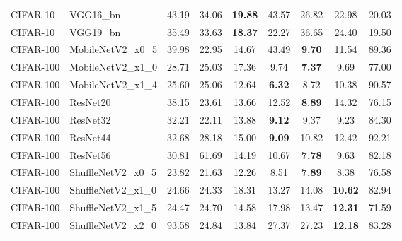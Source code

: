 \begin{table}[h!]
{\begin{tabular}{llccccccc}
 CIFAR-10 &          VGG16\_bn &         43.19 &        34.06 & \textbf{19.88} &                  43.57 &                  26.82 &                  22.98 &       20.03 \\
 CIFAR-10 &          VGG19\_bn &         35.49 &        33.63 & \textbf{18.37} &                  22.27 &                  36.65 &                  24.40 &       19.50 \\
CIFAR-100 &  MobileNetV2\_x0\_5 &         39.98 &        22.95 &                  14.67 &                  43.49 &  \textbf{9.70} &                  11.54 &       89.36 \\
CIFAR-100 &  MobileNetV2\_x1\_0 &         28.71 &        25.03 &                  17.36 &                   9.74 &  \textbf{7.37} &                   9.69 &       77.00 \\
CIFAR-100 &  MobileNetV2\_x1\_4 &         25.60 &        25.06 &                  12.64 &  \textbf{6.32} &                   8.72 &                  10.38 &       90.57 \\
CIFAR-100 &          ResNet20 &         38.15 &        23.61 &                  13.66 &                  12.52 &  \textbf{8.89} &                  14.32 &       76.15 \\
CIFAR-100 &          ResNet32 &         32.21 &        22.11 &                  13.88 &  \textbf{9.12} &                   9.37 &                   9.23 &       84.30 \\
CIFAR-100 &          ResNet44 &         32.68 &        28.18 &                  15.00 &  \textbf{9.09} &                  10.82 &                  12.42 &       92.21 \\
CIFAR-100 &          ResNet56 &         30.81 &        61.69 &                  14.19 &                  10.67 &  \textbf{7.78} &                   9.63 &       82.18 \\
CIFAR-100 & ShuffleNetV2\_x0\_5 &         23.82 &        21.63 &                  12.26 &                   8.51 &  \textbf{7.89} &                   8.38 &       76.58 \\
CIFAR-100 & ShuffleNetV2\_x1\_0 &         24.66 &        24.33 &                  18.31 &                  13.27 &                  14.08 & \textbf{10.62} &       82.94 \\
CIFAR-100 & ShuffleNetV2\_x1\_5 &         24.47 &        24.70 &                  14.58 &                  17.98 &                  13.47 & \textbf{12.31} &       71.59 \\
CIFAR-100 & ShuffleNetV2\_x2\_0 &         93.58 &        24.84 &                  13.84 &                  27.37 &                  27.23 & \textbf{12.18} &       83.28 \\

\end{tabular}}
\end{table}
